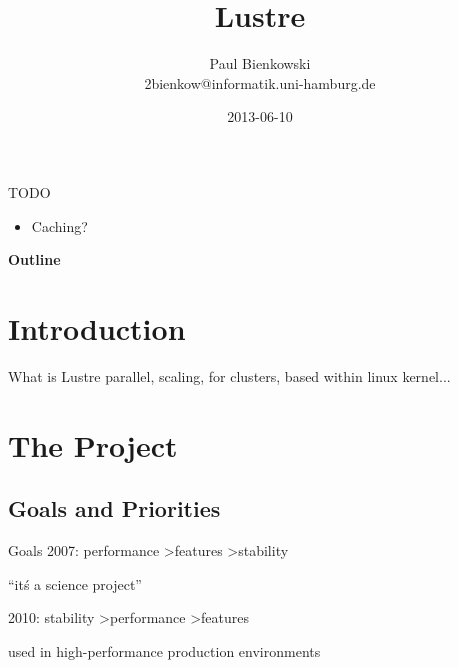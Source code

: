 \documentclass[compress,t,xcolor=dvipsnames]{beamer}
\title{Lustre}
\author{Paul Bienkowski \\[0.2em] \scriptsize 2bienkow@informatik.uni-hamburg.de}
\institute{Proseminar ``Ein-/Ausgabe - Stand der Wissenschaft''}
\date{2013-06-10}
\newif\iffinal
\newcommand{\sectiontoc}{
    \begin{frame}{\textbf{\insertsectionhead}}
        \tableofcontents[current]
    \end{frame}

    \addtocounter{framenumber}{-1}%
}
\begin{document}

\iffinal\else
\begin{frame}{TODO}
    \begin{itemize}
        \item Caching?
    \end{itemize}
\end{frame}
\fi

\begin{frame}
    \titlepage
\end{frame}

\begin{frame}{\textbf{Outline}}
    \tableofcontents
\end{frame}


\section{Introduction}

\begin{frame}{What is Lustre}
    parallel, scaling, for clusters, based within linux kernel...
\end{frame}


\section{The Project}
\sectiontoc

\subsection{Goals and Priorities}
\begin{frame}{Goals}
    2007: performance \textgreater features \textgreater stability

    ``it\'s a science project''

    2010: stability \textgreater performance \textgreater features

    used in high-performance production environments
\end{frame}
\end{document}
